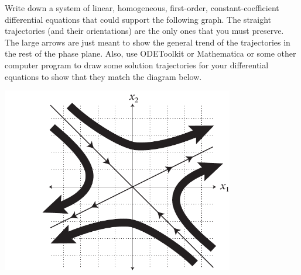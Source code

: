 \documentclass[boxes]{gsypset}
\begin{document}
\begin{problem}
	Write down a system of linear, homogeneous, first-order, constant-coefficient 
	differential equations that could support the following graph. 
	The straight trajectories (and their orientations) are the only ones that you must preserve. 
	The large arrows are just meant to show the general trend of the trajectories in the rest of
  the phase plane. 
  Also, use ODEToolkit or Mathematica or some other computer program to draw some solution 
  trajectories for your differential equations to show that they match the diagram below.
  
  \begin{center}
		\includegraphics[width=4in,keepaspectratio=true]{img/hw8phaseplane}
	\end{center}
\end{problem}
\begin{solution}
	
\end{solution}
\end{document}
